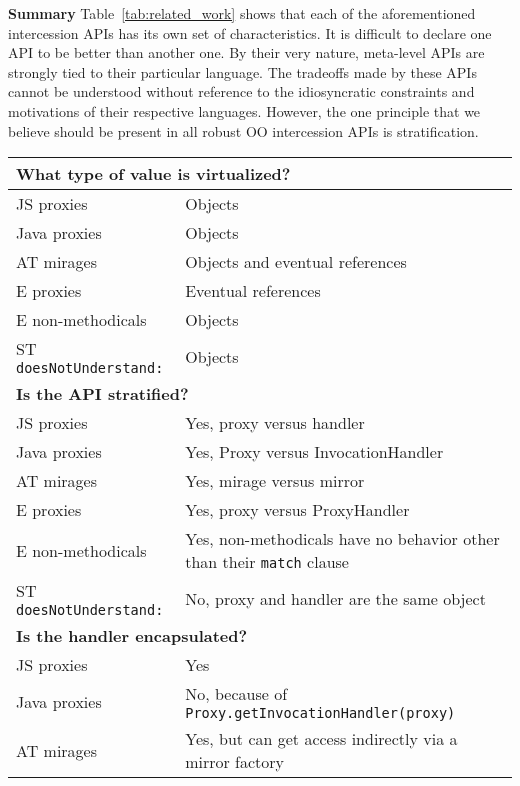 \documentclass{acm_proc_article-sp}
\begin{document}
\textbf{Summary} Table~\ref{tab:related_work} shows that each of the aforementioned intercession APIs has its own set of characteristics. It is difficult to declare one API to be better than another one. By their very nature, meta-level APIs are strongly tied to their particular language. The tradeoffs made by these APIs cannot be understood without reference to the idiosyncratic constraints and motivations of their respective languages. However, the one principle that we believe should be present in all robust OO intercession APIs is stratification.

\begin{table*}
\centering
\begin{tabular}{|p{}|p{}|}
    \hline
    \multicolumn{2}{|l|}{\textbf{What type of value is virtualized?}}\\
    \hline
    JS proxies        & Objects\\
    Java proxies      & Objects\\
    AT mirages        & Objects and eventual references\\
    E proxies         & Eventual references\\
    E non-methodicals & Objects\\
    ST \texttt{doesNotUnderstand:}  & Objects\\
    \hline
    \multicolumn{2}{|l|}{\textbf{Is the API stratified?}}\\
    \hline
    JS proxies        & Yes, proxy versus handler\\
    Java proxies      & Yes, Proxy versus InvocationHandler\\
    AT mirages        & Yes, mirage versus mirror\\
    E proxies         & Yes, proxy versus ProxyHandler\\
    E non-methodicals & Yes, non-methodicals have no behavior other than their \texttt{match} clause\\
    ST \texttt{doesNotUnderstand:}  & No, proxy and handler are the same object\\
    \hline
    \multicolumn{2}{|l|}{\textbf{Is the handler encapsulated?}}\\
    \hline
    JS proxies        & Yes\\
    Java proxies      & No, because of \texttt{Proxy.getInvocationHandler(proxy)}\\
    AT mirages        & Yes, but can get access indirectly via a mirror factory\\

\end{tabular}
\end{table*}
\end{document}
